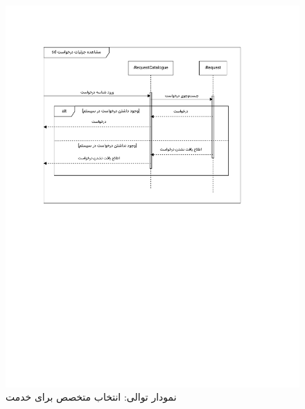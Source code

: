 \begin{figure}[ht!]
	\centering
	\includegraphics[scale=0.8, page=2]{figs/OOD-Sequence-2.pdf}
	\caption{نمودار توالی: انتخاب متخصص برای خدمت}
\end{figure}
\FloatBarrier
\newpage


